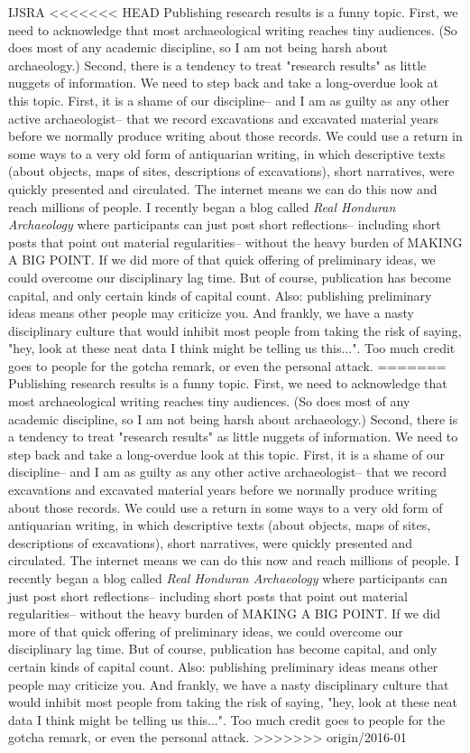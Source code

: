 \begin{labeling}{IJSRA}
<<<<<<< HEAD
Publishing research results is a funny topic. First, we need to acknowledge that most archaeological writing reaches tiny audiences. (So does most of any academic discipline, so I am not being harsh about archaeology.) Second, there is a tendency to treat "research results" as little nuggets of information. We need to step back and take a long-overdue look at this topic. First, it is a shame of our discipline-- and I am as guilty as any other active archaeologist-- that we record excavations and excavated material years before we normally produce writing about those records. We could use a return in some ways to a very old form of antiquarian writing, in which descriptive texts (about objects, maps of sites, descriptions of excavations), short narratives, were quickly presented and circulated. The internet means we can do this now and reach millions of people. I recently began a blog called \emph{Real Honduran Archaeology} where participants can just post short reflections-- including short posts that point out material regularities-- without the heavy burden of MAKING A BIG POINT. If we did more of that quick offering of preliminary ideas, we could overcome our disciplinary lag time. But of course, publication has become capital, and only certain kinds of capital count. Also: publishing preliminary ideas means other people may criticize you. And frankly, we have a nasty disciplinary culture that would inhibit most people from taking the risk of saying, "hey, look at these neat data I think might be telling us this...". Too much credit goes to people for the gotcha remark, or even the personal attack. 
=======
Publishing research results is a funny topic. First, we need to acknowledge that most archaeological writing reaches tiny audiences. (So does most of any academic discipline, so I am not being harsh about archaeology.) Second, there is a tendency to treat "research results" as little nuggets of information. We need to step back and take a long-overdue look at this topic. First, it is a shame of our discipline-- and I am as guilty as any other active archaeologist-- that we record excavations and excavated material years before we normally produce writing about those records. We could use a return in some ways to a very old form of antiquarian writing, in which descriptive texts (about objects, maps of sites, descriptions of excavations), short narratives, were quickly presented and circulated. The internet means we can do this now and reach millions of people. I recently began a blog called \textit{Real Honduran Archaeology} where participants can just post short reflections-- including short posts that point out material regularities-- without the heavy burden of {\scshape MAKING A BIG POINT}. If we did more of that quick offering of preliminary ideas, we could overcome our disciplinary lag time. But of course, publication has become capital, and only certain kinds of capital count. Also: publishing preliminary ideas means other people may criticize you. And frankly, we have a nasty disciplinary culture that would inhibit most people from taking the risk of saying, "hey, look at these neat data I think might be telling us this...". Too much credit goes to people for the gotcha remark, or even the personal attack. 
>>>>>>> origin/2016-01


\end{labeling}
